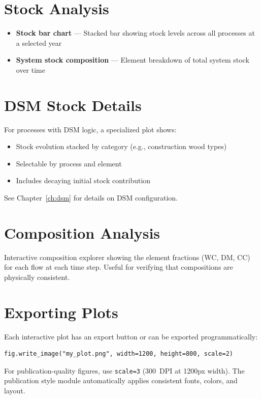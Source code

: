 \section{Stock Analysis}

\begin{itemize}
  \item \textbf{Stock bar chart} --- Stacked bar showing stock levels across all processes at a selected year
  \item \textbf{System stock composition} --- Element breakdown of total system stock over time
\end{itemize}

\section{DSM Stock Details}

For processes with DSM logic, a specialized plot shows:
\begin{itemize}
  \item Stock evolution stacked by category (e.g., construction wood types)
  \item Selectable by process and element
  \item Includes decaying initial stock contribution
\end{itemize}

See Chapter~\ref{ch:dsm} for details on DSM configuration.

\section{Composition Analysis}

Interactive composition explorer showing the element fractions (WC, DM, CC) for each flow at each time step. Useful for verifying that compositions are physically consistent.

\section{Exporting Plots}

Each interactive plot has an export button or can be exported programmatically:

\begin{lstlisting}[style=python]
fig.write_image("my_plot.png", width=1200, height=800, scale=2)
\end{lstlisting}

\begin{tipbox}
For publication-quality figures, use \texttt{scale=3} (300~DPI at 1200px width). The publication style module automatically applies consistent fonts, colors, and layout.
\end{tipbox}


